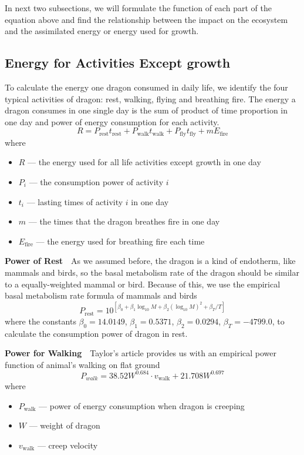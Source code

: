 \documentclass{mcmthesis}
\newcommand{\upcite}[1]{\textsuperscript{\textsuperscript{\cite{#1}}}}
\begin{document}
In next two subsections, we will formulate the function of each part of the equation above and find the relationship between the impact on the ecosystem and the assimilated energy or energy used for growth.

\subsection{Energy for Activities Except growth}

To calculate the energy one dragon consumed in daily life, we identify the four typical activities of dragon: rest, walking, flying and breathing fire. The energy a dragon consumes in one single day is the sum of product of time proportion in one day and power of energy consumption for each activity.
\begin{equation}
\label{R}
R=P_{\text{rest}}t_{\text{rest}}+P_{\text{walk}}t_{\text{walk}}+P_{\text{fly}}t_{\text{fly}}+mE_{\text{fire}}
\end{equation} 
where\begin{itemize}
\item $R$ --- the energy used for all life activities except growth in one day
\item $P_i$ --- the consumption power of activity $i$
\item $t_i$ --- lasting times of activity $i$ in one day
\item $m$ --- the times that the dragon breathes fire in one day
\item $E_{\text{fire}}$ --- the energy used for breathing fire each time
\end{itemize}

\textbf{Power of Rest}~~As we assumed before, the dragon is a kind of endotherm, like mammals and birds, so the basal metabolism rate of the dragon should be similar to a equally-weighted mammal or bird. Because of this, we use the empirical basal metabolism rate formula of mammals and birds\upcite{kolokotrones2010curvature}
\begin{equation}
\label{Prest}
P_{\text{rest}}=10^{[\beta_0+\beta_1\log_{10}M+\beta_2(\log_{10}M)^2+\beta_T/T]}
\end{equation}
where the constants $\beta_0=14.0149$, $\beta_1=0.5371$, $\beta_2=0.0294$, $\beta_T=-4799.0$, to calculate the consumption power of dragon in rest.

\textbf{Power for Walking}~~Taylor's article\upcite{taylor1982energetics} provides us with an empirical power function of animal's walking on flat ground
\begin{equation}
\label{Pwalk}
P_{walk}=38.52W^{0.684}\cdot v_{\text{walk}}+21.708W^{0.697}
\end{equation}
where\begin{itemize}
\item $P_{\text{walk}}$ --- power of energy consumption when dragon is creeping
\item $W$ --- weight of dragon
\item $v_{\text{walk}}$ --- creep velocity
\end{itemize}
\end{document}
